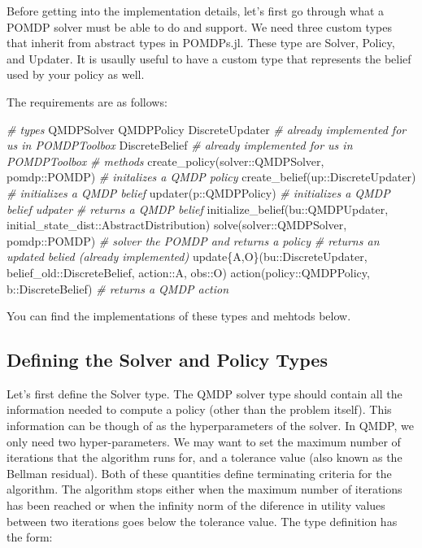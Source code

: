 \documentclass[12pt,]{article}
\newenvironment{Shaded}{}{}
\newcommand{\CommentTok}[1]{\textcolor[rgb]{0.38,0.63,0.69}{\textit{{#1}}}}
\newcommand{\NormalTok}[1]{{#1}}
\begin{document}
Before getting into the implementation details, let's first go through
what a POMDP solver must be able to do and support. We need three custom
types that inherit from abstract types in POMDPs.jl. These type are
Solver, Policy, and Updater. It is usaully useful to have a custom type
that represents the belief used by your policy as well.

The requirements are as follows:

\begin{Shaded}
\begin{Highlighting}[]
\CommentTok{# types }
\NormalTok{QMDPSolver}
\NormalTok{QMDPPolicy}
\NormalTok{DiscreteUpdater }\CommentTok{# already implemented for us in POMDPToolbox}
\NormalTok{DiscreteBelief }\CommentTok{# already implemented for us in POMDPToolbox}
\CommentTok{# methods}
\NormalTok{create_policy(solver::QMDPSolver, pomdp::POMDP) }\CommentTok{# initalizes a QMDP policy}
\NormalTok{create_belief(up::DiscreteUpdater) }\CommentTok{# initializes a QMDP belief}
\NormalTok{updater(p::QMDPPolicy) }\CommentTok{# initializes a QMDP belief udpater}
\CommentTok{# returns a QMDP belief}
\NormalTok{initialize_belief(bu::QMDPUpdater, initial_state_dist::AbstractDistribution) }
\NormalTok{solve(solver::QMDPSolver, pomdp::POMDP) }\CommentTok{# solver the POMDP and returns a policy}
\CommentTok{# returns an updated belied (already implemented)}
\NormalTok{update\{A,O\}(bu::DiscreteUpdater, belief_old::DiscreteBelief, action::A, obs::O) }
\NormalTok{action(policy::QMDPPolicy, b::DiscreteBelief) }\CommentTok{# returns a QMDP action}
\end{Highlighting}
\end{Shaded}

You can find the implementations of these types and mehtods below.

\subsection{Defining the Solver and Policy
Types}\label{defining-the-solver-and-policy-types}

Let's first define the Solver type. The QMDP solver type should contain
all the information needed to compute a policy (other than the problem
itself). This information can be though of as the hyperparameters of the
solver. In QMDP, we only need two hyper-parameters. We may want to set
the maximum number of iterations that the algorithm runs for, and a
tolerance value (also known as the Bellman residual). Both of these
quantities define terminating criteria for the algorithm. The algorithm
stops either when the maximum number of iterations has been reached or
when the infinity norm of the diference in utility values between two
iterations goes below the tolerance value. The type definition has the
form:
\end{document}
